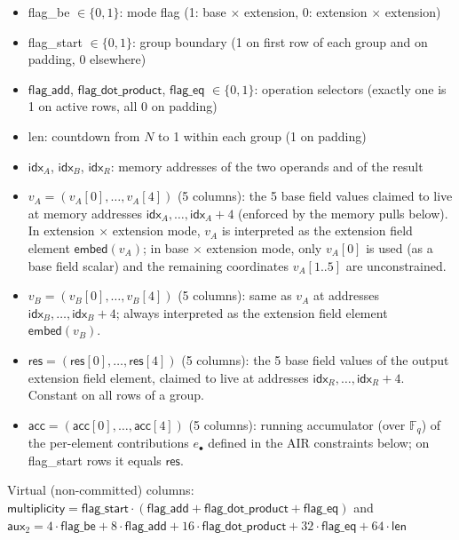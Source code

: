 \documentclass{article}
\theoremstyle{definition}
\newcommand{\Fq}{\mathbb F_q}
\begin{document}
\begin{itemize}
    \item \textsf{flag\_be} $\in \{0,1\}$: mode flag (1: base $\times$ extension, 0: extension $\times$ extension)
    \item \textsf{flag\_start} $\in \{0,1\}$: group boundary (1 on first row of each group and on padding, 0 elsewhere)
    \item $\textsf{flag\_add}$, $\textsf{flag\_dot\_product}$, $\textsf{flag\_eq}$ $\in \{0,1\}$: operation selectors (exactly one is 1 on active rows, all 0 on padding)
    \item \textsf{len}: countdown from $N$ to 1 within each group (1 on padding)
    \item $\textsf{idx}_A$, $\textsf{idx}_B$, $\textsf{idx}_R$: memory addresses of the two operands and of the result
    \item $v_A = (v_A[0], \dots, v_A[4])$ (5 columns): the 5 base field values claimed to live at memory addresses $\textsf{idx}_A, \dots, \textsf{idx}_A + 4$ (enforced by the memory pulls below). In extension $\times$ extension mode, $v_A$ is interpreted as the extension field element $\mathsf{embed}(v_A)$; in base $\times$ extension mode, only $v_A[0]$ is used (as a base field scalar) and the remaining coordinates $v_A[1..5]$ are unconstrained.
    \item $v_B = (v_B[0], \dots, v_B[4])$ (5 columns): same as $v_A$ at addresses $\textsf{idx}_B, \dots, \textsf{idx}_B + 4$; always interpreted as the extension field element $\mathsf{embed}(v_B)$.
    \item $\textsf{res} = (\textsf{res}[0], \dots, \textsf{res}[4])$ (5 columns): the 5 base field values of the output extension field element, claimed to live at addresses $\textsf{idx}_R, \dots, \textsf{idx}_R + 4$. Constant on all rows of a group.
    \item $\textsf{acc} = (\textsf{acc}[0], \dots, \textsf{acc}[4])$ (5 columns): running accumulator (over $\Fq$) of the per-element contributions $e_\bullet$ defined in the AIR constraints below; on \textsf{flag\_start} rows it equals $\textsf{res}$.
\end{itemize}

Virtual (non-committed) columns: $\textsf{multiplicity} = \textsf{flag\_start} \cdot (\textsf{flag\_add} + \textsf{flag\_dot\_product} + \textsf{flag\_eq})$ and $\textsf{aux}_2 = 4 \cdot \textsf{flag\_be} + 8 \cdot \textsf{flag\_add} + 16 \cdot \textsf{flag\_dot\_product} + 32 \cdot \textsf{flag\_eq} + 64 \cdot \textsf{len}$
\end{document}
